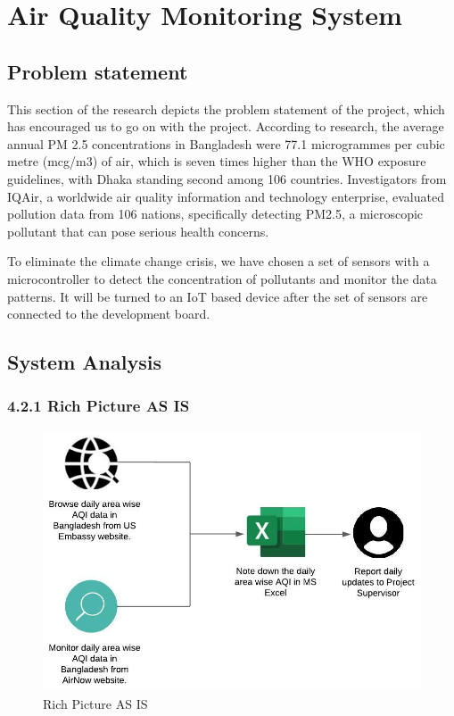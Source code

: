 \chapter{Air Quality Monitoring System}

\section{Problem statement}

This section of the research depicts the problem statement of the project, which has encouraged us to go on with the project. According to research, the average annual PM 2.5 concentrations in Bangladesh were 77.1 microgrammes per cubic metre (mcg/m3) of air, which is seven times higher than the WHO exposure guidelines, with Dhaka standing second among 106 countries. Investigators from IQAir, a worldwide air quality information and technology enterprise, evaluated pollution data from 106 nations, specifically detecting PM2.5, a microscopic pollutant that can pose serious health concerns. 

To eliminate the climate change crisis, we have chosen a set of sensors with a microcontroller to detect the concentration of pollutants and monitor the data patterns. It will be turned to an IoT based device after the set of sensors are connected to the development board.

\vspace{0.5cm}
\section{System Analysis}
\vspace{0.5cm}

\vspace{0.5cm}
\subsection{4.2.1    Rich Picture AS IS}
\vspace{0.5cm}

\begin{figure} [H]
    \centering
    \includegraphics[width=.8\textwidth]{images/4_1_rich_pic_AS_IS.jpeg}
    \caption{Rich Picture AS IS}
    \label{fig:Rich Picture AS IS}
\end{figure}

